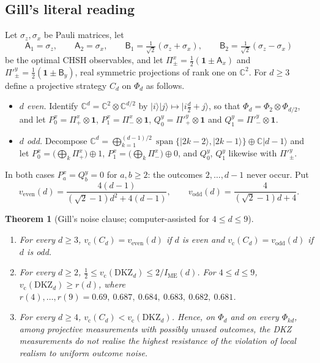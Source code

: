 \documentclass[11pt]{amsart}
\newtheorem{theorem}{Theorem}[section]
\theoremstyle{definition}
\theoremstyle{remark}
\numberwithin{equation}{section}
\newcommand{\C}{\mathbb{C}}
\newcommand{\IME}{I_{\mathrm{ME}}}
\newcommand{\one}{\mathbf{1}}
\newcommand{\vc}{v_{\mathrm c}}
\newcommand{\veven}{v_{\mathrm{even}}}
\newcommand{\vodd}{v_{\mathrm{odd}}}
\newcommand{\DKZ}{\mathrm{DKZ}}
\begin{document}
\subsection{Gill's literal reading}\label{subsec:literal}
Let $\sigma_z,\sigma_x$ be Pauli matrices, let
\[
\mathsf A_1=\sigma_z,\qquad\mathsf A_2=\sigma_x,\qquad\mathsf B_1=\tfrac1{\sqrt2}(\sigma_z+\sigma_x),\qquad
\mathsf B_2=\tfrac1{\sqrt2}(\sigma_z-\sigma_x)
\]
be the optimal CHSH observables, and let $\Pi^x_\pm=\frac12(\one\pm\mathsf A_x)$ and $\Pi'^y_\pm=\frac12(\one\pm\mathsf B_y)$,
real symmetric projections of rank one on $\C^2$. For $d\ge3$ define a projective strategy $C_d$ on $\Phi_d$ as
follows.
\begin{itemize}
\item \emph{$d$ even.} Identify $\C^d=\C^2\otimes\C^{d/2}$ by $|i\rangle|j\rangle\mapsto|i\tfrac d2+j\rangle$, so that
$\Phi_d=\Phi_2\otimes\Phi_{d/2}$, and let $P^x_0=\Pi^x_+\otimes\one$, $P^x_1=\Pi^x_-\otimes\one$,
$Q^y_0=\Pi'^y_+\otimes\one$ and $Q^y_1=\Pi'^y_-\otimes\one$.
\item \emph{$d$ odd.} Decompose
$\C^d=\bigoplus_{k=1}^{(d-1)/2}\operatorname{span}\{|2k-2\rangle,|2k-1\rangle\}\oplus\C|d-1\rangle$ and let
$P^x_0=\bigl(\bigoplus_k\Pi^x_+\bigr)\oplus1$, $P^x_1=\bigl(\bigoplus_k\Pi^x_-\bigr)\oplus0$, and $Q^y_0$, $Q^y_1$
likewise with $\Pi'^y_\pm$.
\end{itemize}
In both cases $P^x_a=Q^y_b=0$ for $a,b\ge2$: the outcomes $2,\dots,d-1$ never occur. Put
\[
\veven(d)=\frac{4(d-1)}{(\sqrt2-1)d^2+4(d-1)},\qquad\vodd(d)=\frac4{(\sqrt2-1)d+4}.
\]

\begin{theorem}[Gill's noise clause; computer-assisted for $4\le d\le9$]\label{thm:literal}
\begin{enumerate}
\item For every $d\ge3$, $\vc(C_d)=\veven(d)$ if $d$ is even and $\vc(C_d)=\vodd(d)$ if $d$ is odd.
\item For every $d\ge2$, $\frac12\le\vc(\DKZ_d)\le2/\IME(d)$. For $4\le d\le9$, $\vc(\DKZ_d)\ge r(d)$, where
$r(4),\dots,r(9)=0.69,\ 0.687,\ 0.684,\ 0.683,\ 0.682,\ 0.681$.
\item For every $d\ge4$, $\vc(C_d)<\vc(\DKZ_d)$. Hence, on $\Phi_d$ and on every $\Phi_{kd}$, among projective
measurements with possibly unused outcomes, the DKZ measurements do not realise the highest resistance of the violation
of local realism to uniform outcome noise.
\end{enumerate}
\end{theorem}
\end{document}
